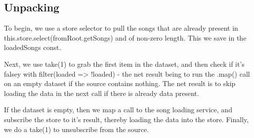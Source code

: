 \subsection{ Unpacking }
To begin, we use a store selector to pull the songs that are already present in
this.store.select(fromRoot.getSongs) and of non-zero length. This we save in the
loadedSongs const.

Next, we use take(1) to grab the first item in the dataset, and then check if
it's falsey with filter(loaded => !loaded) - the net result being to run the
.map() call on an empty dataset if the source contains nothing. The net result
is to skip loading the data in the next call if there is already data present.

If the dataset is empty, then we map a call to the song loading service, and
subscribe the store to it's result, thereby loading the data into the store.
Finally, we do a take(1) to unsubscribe from the source.
